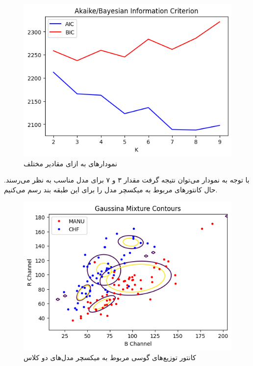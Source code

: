 \documentclass[12pt,onecolumn,a4paper]{article}
\begin{document}
\begin{figure}[t!]
    \label{fig:1}
    \begin{center}
    \includegraphics[scale=0.7]{q8_aicbic.png}
    \caption{نمودارهای  به ازای مقادیر مختلف }
    \end{center}
\end{figure}
\newpage

با توجه به نمودار می‌توان نتیجه گرفت مقدار ۳ و ۷ برای مدل مناسب به نظر می‌رسند. حال کانتورهای مربوط به میکسچر مدل را برای این طبقه بند رسم می‌کنیم.

\begin{figure}[h!]
    \label{fig:2}
    \begin{center}
    \includegraphics[scale=0.7]{q8_scatter.png}
    \caption{کانتور توزیع‌های گوسی مربوط به میکسچر مدل‌های دو کلاس}
    \end{center}
\end{figure}
\end{document}

